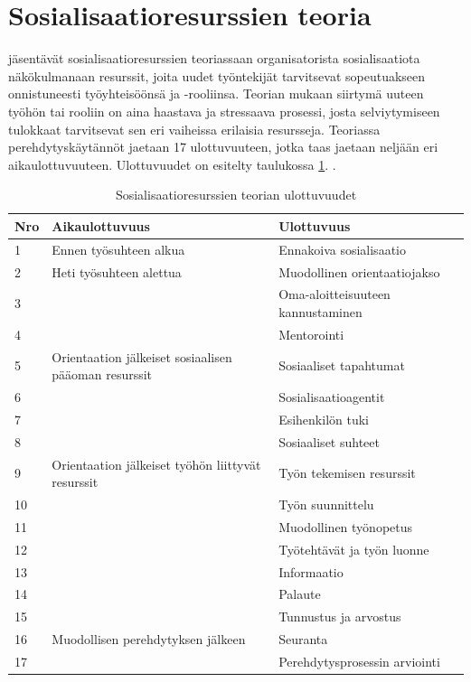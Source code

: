 \documentclass[utf8]{gradu3}
\begin{document}
\section{Sosialisaatioresurssien teoria}
\label{luku-SRT-teoria}

\textcite{saks-gruman-2012} jäsentävät sosialisaatioresurssien teoriassaan organisatorista sosialisaatiota näkökulmanaan resurssit, joita uudet työntekijät tarvitsevat sopeutuakseen onnistuneesti työyhteisöönsä ja -rooliinsa. Teorian mukaan siirtymä uuteen työhön tai rooliin on aina haastava ja stressaava prosessi, josta selviytymiseen tulokkaat tarvitsevat sen eri vaiheissa erilaisia resursseja. Teoriassa perehdytyskäytännöt jaetaan 17 ulottuvuuteen, jotka taas jaetaan neljään eri aikaulottuvuuteen. Ulottuvuudet on esitelty taulukossa \ref{tbl:srt-ulottuvuudet}. \parencite{saks-gruman-2012}.

\begin{table}[h]
    \footnotesize
    \begin{tabular}{llll}
        \toprule
        \textbf{Nro} & \textbf{Aikaulottuvuus} & \textbf{Ulottuvuus} \\
        \toprule
        1 & Ennen työsuhteen alkua & Ennakoiva sosialisaatio \\
        \midrule
        2 & Heti työsuhteen alettua & Muodollinen orientaatiojakso \\
        3 & & Oma-aloitteisuuteen kannustaminen \\
        4 & & Mentorointi \\
        \midrule
        5 & Orientaation jälkeiset sosiaalisen pääoman resurssit & Sosiaaliset tapahtumat \\
        6 & & Sosialisaatioagentit \\
        7 & & Esihenkilön tuki \\
        8 & & Sosiaaliset suhteet \\
        \midrule
        9 & Orientaation jälkeiset työhön liittyvät resurssit & Työn tekemisen resurssit \\
        10 &&  Työn suunnittelu \\
        11 && Muodollinen työnopetus \\
        12 && Työtehtävät ja työn luonne \\
        13 && Informaatio \\
        14 && Palaute \\
        15 && Tunnustus ja arvostus \\
        \midrule
        16 & Muodollisen perehdytyksen jälkeen & Seuranta \\
        17 && Perehdytysprosessin arviointi \\
        \bottomrule
    \end{tabular}
    \caption{Sosialisaatioresurssien teorian ulottuvuudet \parencite{saks-gruman-2012}}
    \label{tbl:srt-ulottuvuudet}
\end{table}
\end{document}

